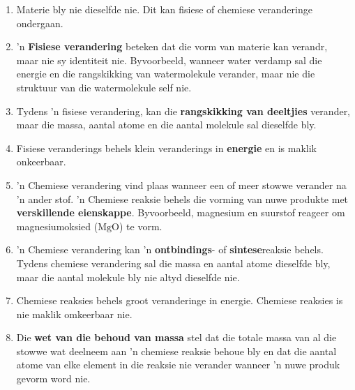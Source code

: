             \nopagebreak
      \label{m38711*id65342}\begin{enumerate}[noitemsep, label=\textbf{\arabic*}. ] 
            \label{m38711*uid40}\item Materie bly nie dieselfde nie. Dit kan fisiese of chemiese veranderinge ondergaan.
\label{m38711*uid41}\item 'n \textbf{Fisiese verandering} beteken dat die vorm van materie kan verandr, maar nie sy identiteit nie. Byvoorbeeld, wanneer water verdamp sal die energie en die rangskikking van watermolekule verander, maar nie die struktuur van die watermolekule self nie.
\label{m38711*uid42}\item Tydens 'n fisiese verandering, kan die \textbf{rangskikking van deeltjies} verander, maar die massa, aantal atome en die aantal molekule sal dieselfde bly.
\label{m38711*uid43}\item Fisiese veranderings behels klein veranderings in \textbf{energie} en is maklik onkeerbaar.
\label{m38711*uid44}\item 'n Chemiese verandering vind plaas wanneer een of meer stowwe verander na  'n ander stof. 'n
Chemiese reaksie behels die vorming van nuwe produkte met \textbf{verskillende eienskappe}. Byvoorbeeld, magnesium en suurstof reageer om magnesiumoksied ($\text{MgO}$) te vorm.
\label{m38711*uid45}\item 'n Chemiese verandering kan 'n \textbf{ontbindings}- of \textbf{sintese}reaksie behels. Tydens chemiese
verandering sal die massa en aantal atome dieselfde bly, maar die aantal molekule bly nie altyd dieselfde nie.
\label{m38711*uid46}\item Chemiese reaksies behels groot veranderinge in energie. Chemiese reaksies is nie maklik omkeerbaar nie.
\label{m38711*uid48}\item Die \textbf{wet van die behoud van massa} stel dat die totale massa van al die stowwe wat deelneem aan 'n chemiese reaksie behoue bly en dat die aantal atome van elke element in die reaksie nie verander wanneer 'n nuwe produk gevorm word nie.

\end{enumerate}
